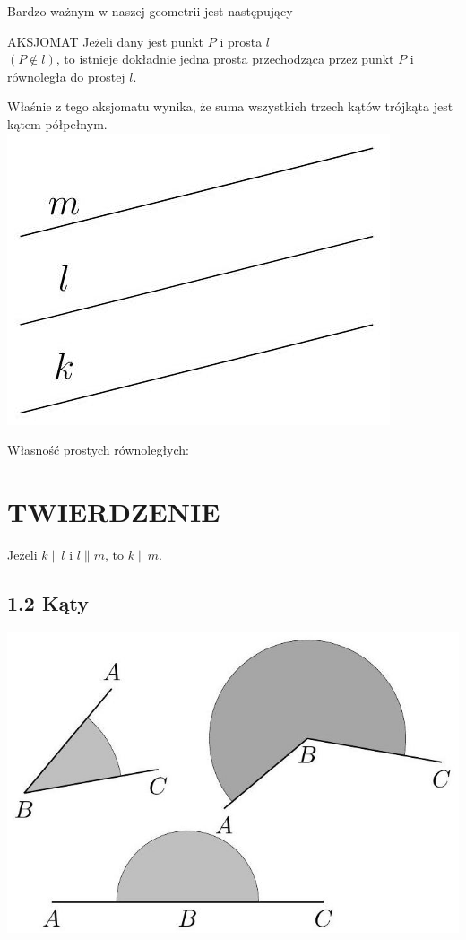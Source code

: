\documentclass[10pt]{article}
\begin{document}
Bardzo ważnym w naszej geometrii jest następujący

AKSJOMAT Jeżeli dany jest punkt \(P\) i prosta \(l\)\\
\((P \notin l)\), to istnieje dokładnie jedna prosta przechodząca przez punkt \(P\) i równoległa do prostej \(l\).

Właśnie z tego aksjomatu wynika, że suma wszystkich trzech kątów trójkąta jest kątem półpełnym.\\
\includegraphics[max width=\textwidth, center]{2024_11_21_71f62bd117d375398909g-008}

Własność prostych równoległych:

\section*{TWIERDZENIE}
Jeżeli \(k \| l\) i \(l \| m\), to \(k \| m\).

\subsection*{1.2 Kąty}
\begin{center}
\includegraphics[max width=\textwidth]{2024_11_21_71f62bd117d375398909g-008(1)}
\end{center}
\end{document}
